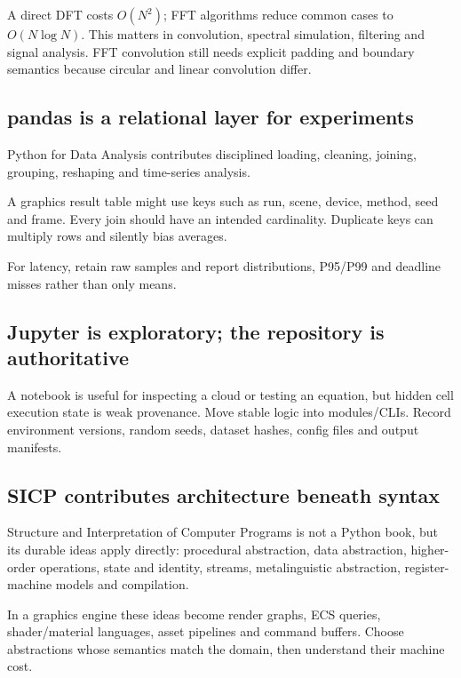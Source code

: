A direct DFT costs \(O(N^2)\); FFT algorithms reduce common cases to \(O(N\log N)\). This matters in convolution, spectral simulation, filtering and signal analysis. FFT convolution still needs explicit padding and boundary semantics because circular and linear convolution differ.

\subsection{pandas is a relational layer for experiments}\label{01-foundations-i-ch017-pandas-is-a-relational-layer-for-experiments}

Python for Data Analysis contributes disciplined loading, cleaning, joining, grouping, reshaping and time-series analysis.

A graphics result table might use keys such as run, scene, device, method, seed and frame. Every join should have an intended cardinality. Duplicate keys can multiply rows and silently bias averages.

For latency, retain raw samples and report distributions, P95/P99 and deadline misses rather than only means.

\subsection{Jupyter is exploratory; the repository is authoritative}\label{01-foundations-i-ch017-jupyter-is-exploratory-the-repository-is-authoritative}

A notebook is useful for inspecting a cloud or testing an equation, but hidden cell execution state is weak provenance. Move stable logic into modules/CLIs. Record environment versions, random seeds, dataset hashes, config files and output manifests.

\subsection{SICP contributes architecture beneath syntax}\label{01-foundations-i-ch017-sicp-contributes-architecture-beneath-syntax}

Structure and Interpretation of Computer Programs is not a Python book, but its durable ideas apply directly: procedural abstraction, data abstraction, higher-order operations, state and identity, streams, metalinguistic abstraction, register-machine models and compilation.

In a graphics engine these ideas become render graphs, ECS queries, shader/material languages, asset pipelines and command buffers. Choose abstractions whose semantics match the domain, then understand their machine cost.

